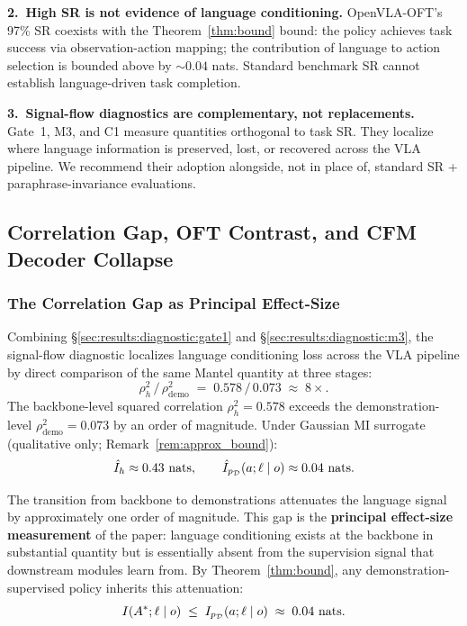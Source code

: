 \textbf{2.~High SR is not evidence of language conditioning.} OpenVLA-OFT's 97\% SR
coexists with the Theorem~\ref{thm:bound} bound: the policy achieves task success via
observation-action mapping; the contribution of language to action selection is bounded
above by $\sim 0.04$ nats. Standard benchmark SR cannot establish language-driven task
completion.

\textbf{3.~Signal-flow diagnostics are complementary, not replacements.} Gate~1, M3, and
C1 measure quantities orthogonal to task SR. They localize where language information is
preserved, lost, or recovered across the VLA pipeline. We recommend their adoption
alongside, not in place of, standard SR + paraphrase-invariance evaluations.

\subsection{Correlation Gap, OFT Contrast, and CFM Decoder Collapse}
\label{sec:results:correlation}
\label{sec:results:oft_contrast}
\label{sec:results:cfm_collapse}

\subsubsection{The Correlation Gap as Principal Effect-Size}
\label{sec:results:correlation:gap}

Combining \S\ref{sec:results:diagnostic:gate1} and \S\ref{sec:results:diagnostic:m3}, the
signal-flow diagnostic localizes language conditioning loss across the VLA pipeline by
direct comparison of the same Mantel quantity at three stages:
\begin{equation}
\rho_h^2 \,/\, \rho_{\text{demo}}^2 \;=\; 0.578 \,/\, 0.073 \;\approx\; 8\times.
\end{equation}
The backbone-level squared correlation $\rho_h^2 = 0.578$ exceeds the
demonstration-level $\rho_{\text{demo}}^2 = 0.073$ by an order of magnitude. Under
Gaussian MI surrogate (qualitative only; Remark~\ref{rem:approx_bound}):
\begin{equation}
\hat{I}_h \approx 0.43 \text{ nats}, \qquad
\hat{I}_{p_{\mathcal{D}}}(a; \ell \mid o) \approx 0.04 \text{ nats}.
\end{equation}

The transition from backbone to demonstrations attenuates the language signal by
approximately one order of magnitude. This gap is the \textbf{principal effect-size
measurement} of the paper: language conditioning exists at the backbone in substantial
quantity but is essentially absent from the supervision signal that downstream modules
learn from. By Theorem~\ref{thm:bound}, any demonstration-supervised policy inherits
this attenuation:
\begin{equation}
I(A^{*}; \ell \mid o) \;\le\; I_{p_{\mathcal{D}}}(a; \ell \mid o) \;\approx\; 0.04 \text{ nats}.
\end{equation}

